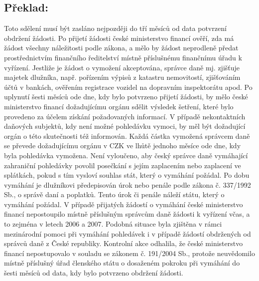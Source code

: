 \documentclass[10pt]{article}
\begin{document}
\pagebreak

\subsection*{Překlad:}

Toto sdělení musí být zasláno nejpozději do tří měsíců od data potvrzení obdržení žádosti.
Po přijetí žádosti české ministerstvo financí ověří, zda má žádost všechny náležitosti podle zákona, a mělo by žádost neprodleně předat prostřednictvím finančního ředitelství místně příslušnému finančnímu úřadu k vyřízení.
Jestliže je žádost o vymožení akceptována, správce daně mj. zjišťuje majetek dlužníka, např. pořízením výpisů z katastru nemovitostí, zjišťováním účtů v bankách, ověřením registrace vozidel na dopravním inspektorátu apod.
Po uplynutí šesti měsíců ode dne, kdy bylo potvrzeno přijetí žádosti, by mělo české ministerstvo financí dožadujícímu orgánu sdělit výsledek šetření, které bylo provedeno za účelem získání požadovaných informací.
V případě nekontaktních daňových subjektů, kdy není možné pohledávku vymoci, by měl být dožadující orgán o této skutečnosti též informován.
Každá částka vymožená správcem daně se převede dožadujícímu orgánu v CZK ve lhůtě jednoho měsíce ode dne, kdy byla pohledávka vymožena.
Není vyloučeno, aby český správce daně vymáhající zahraniční pohledávky povolil posečkání s jejím zaplacením nebo zaplacení ve splátkách, pokud s tím vysloví souhlas stát, který o vymáhání požádal.
Po dobu vymáhání je dlužníkovi předepisován úrok nebo penále podle zákona č. 337/1992 Sb., o správě daní a poplatků.
Tento úrok či penále náleží státu, který o vymáhání požádal.
V případě přijatých žádostí o vymáhání české ministerstvo financí nepostoupilo místně příslušným správcům daně žádosti k vyřízení včas, a to zejména v letech 2006 a 2007.
Podobná situace byla zjištěna v rámci mezinárodní pomoci při vymáhání pohledávek i v případě žádostí obdržených od správců daně z České republiky.
Kontrolní akce odhalila, že české ministerstvo financí nepostupovalo v souladu se zákonem č. 191/2004 Sb., protože neuvědomilo místně příslušný úřad členského státu o dosaženém pokroku při vymáhání do šesti měsíců od data, kdy bylo potvrzeno obdržení žádosti.
\end{document}
